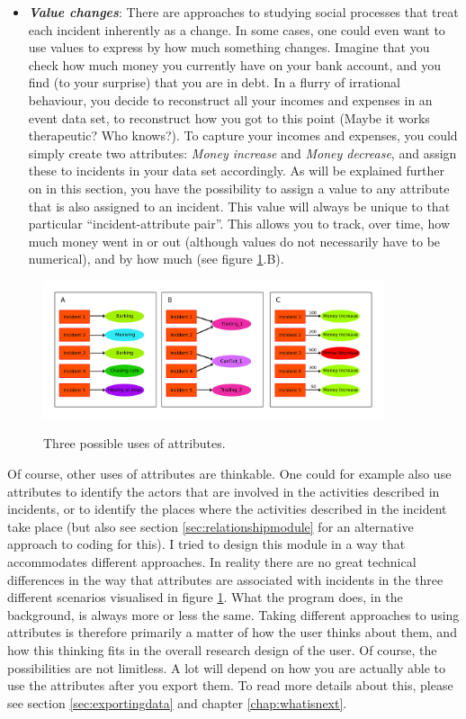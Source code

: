 \documentclass{memoir}
\begin{document}
\begin{itemize}
\item{\emph{\textbf{Value changes}}: There are approaches to studying social processes that treat each incident inherently as a change. In some cases, one could even want to use values to express by how much something changes. Imagine that you check how much money you currently have on your bank account, and you find (to your surprise) that you are in debt. In a flurry of irrational behaviour, you decide to reconstruct all your incomes and expenses in an event data set, to reconstruct how you got to this point (Maybe it works therapeutic? Who knows?). To capture your incomes and expenses, you could simply create two attributes: \emph{Money increase} and \emph{Money decrease}, and assign these to incidents in your data set accordingly. As will be explained further on in this section, you have the possibility to assign a value to any attribute that is also assigned to an incident. This value will always be unique to that particular ``incident-attribute pair''. This allows you to track, over time, how much money went in or out (although values do not necessarily have to be numerical), and by how much (see figure \ref{fig:usesofattributes}.B).}
\end{itemize}

\begin{figure}[h!]
  \centering
  \caption{Three possible uses of attributes.}
  \includegraphics[width=100mm]{Diagram_3.pdf}
  \label{fig:usesofattributes}
\end{figure}

Of course, other uses of attributes are thinkable. One could for example also use attributes to identify the actors that are involved in the activities described in incidents, or to identify the places where the activities described in the incident take place (but also see section \ref{sec:relationshipmodule} for an alternative approach to coding for this). I tried to design this module in a way that accommodates different approaches. In reality there are no great technical differences in the way that attributes are associated with incidents in the three different scenarios visualised in figure \ref{fig:usesofattributes}. What the program does, in the background, is always more or less the same. Taking different approaches to using attributes is therefore primarily a matter of how the user thinks about them, and how this thinking fits in the overall research design of the user. Of course, the possibilities are not limitless. A lot will depend on how you are actually able to use the attributes after you export them. To read more details about this, please see section \ref{sec:exportingdata} and chapter \ref{chap:whatisnext}.
\end{document}
